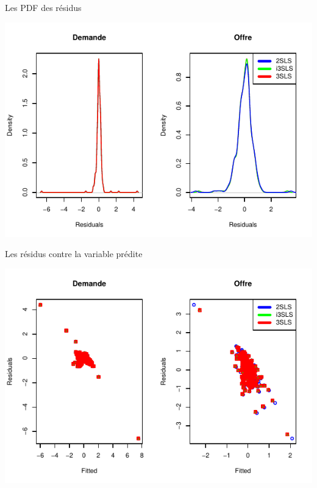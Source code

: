 \documentclass[11pt,ignorenonframetext,]{beamer}
\begin{document}
\begin{frame}{Les PDF des résidus}
\protect\hypertarget{les-pdf-des-residus}{}

\tiny

\begin{center}\includegraphics{Presentation_files/figure-beamer/unnamed-chunk-59-1} \end{center}

\normalsize

\end{frame}

\begin{frame}{Les résidus contre la variable prédite}
\protect\hypertarget{les-residus-contre-la-variable-predite}{}

\tiny

\begin{center}\includegraphics{Presentation_files/figure-beamer/unnamed-chunk-60-1} \end{center}

\normalsize

\end{frame}
\end{document}
